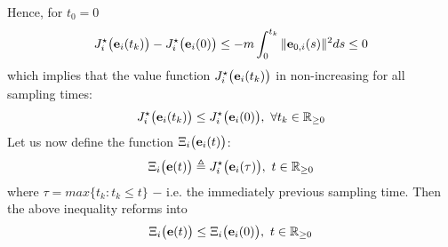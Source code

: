 Hence, for $t_0 = 0$
\begin{align}
  J_i^{\star}\big(\bm{\mathbf{e}}_i(t_{k})\big) - J_i^{\star}\big(\bm{\mathbf{e}}_i(0)\big) \leq
    -m \int_{0}^{t_{k}} \|\bm{\mathbf{e}}_{0,i}(s)\|^2 ds \leq 0
\label{eq:J_opt_between_k_and_0}
\end{align}
which implies that the value function $J_i^{\star}\big(\bm{\mathbf{e}}_i(t_{k})\big)$
in non-increasing for all sampling times:
\begin{align}
  J_i^{\star}\big(\bm{\mathbf{e}}_i(t_{k})\big) \leq J_i^{\star}\big(\bm{\mathbf{e}}_i(0)\big),\ \forall t_k \in \mathbb{R}_{\geq0}
\end{align}
Let us now define the function $\Xi_i\big(\bm{\mathbf{e}}_i(t)\big)$:
\begin{align}
  \Xi_i\big(\bm{\mathbf{e}}(t)\big) \triangleq J_i^{\star}\big(\bm{\mathbf{e}}_i(\tau)\big),\ t \in \mathbb{R}_{\geq0}
\end{align}
where $\tau = max\{t_k : t_k \leq t\}$ $-$ i.e. the immediately previous sampling
time. Then the above inequality reforms into
\begin{align}
  \Xi_i\big(\bm{\mathbf{e}}(t)\big) \leq \Xi_i\big(\bm{\mathbf{e}}_i(0)\big),\ t \in \mathbb{R}_{\geq0}
\end{align}


